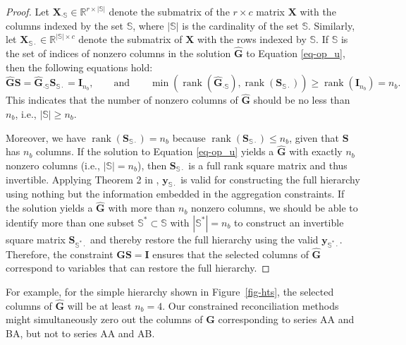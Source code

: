 \documentclass[
  11pt]{article}
\theoremstyle{plain}
\theoremstyle{remark}
\begin{document}
\begin{proof}
Let \(\bm{X}_{\cdot \mathbb{S}} \in \mathbb{R}^{r \times |\mathbb{S}|}\)
denote the submatrix of the \(r \times c\) matrix \(\bm{X}\) with the
columns indexed by the set \(\mathbb{S}\), where \(|\mathbb{S}|\) is the
cardinality of the set \(\mathbb{S}\). Similarly, let
\(\bm{X}_{\mathbb{S}\cdot} \in \mathbb{R}^{|\mathbb{S}| \times c}\)
denote the submatrix of \(\bm{X}\) with the rows indexed by
\(\mathbb{S}\). If \(\mathbb{S}\) is the set of indices of nonzero
columns in the solution \(\hat{\bm{G}}\) to Equation \eqref{eq-op_u},
then the following equations hold: \[
\hat{\bm{G}}\bm{S} = \hat{\bm{G}}_{\cdot \mathbb{S}}\bm{S}_{\mathbb{S}\cdot} = \bm{I}_{n_b},
\qquad\text{and}\qquad
\min \left(\operatorname{rank}(\hat{\bm{G}}_{\cdot \mathbb{S}}), \operatorname{rank}(\bm{S}_{\mathbb{S}\cdot})\right) \geq \operatorname{rank}(\bm{I}_{n_b})=n_b.
\] This indicates that the number of nonzero columns of \(\hat{\bm{G}}\)
should be no less than \(n_b\), i.e., \(|\mathbb{S}| \geq n_b\).

Moreover, we have
\(\operatorname{rank}(\bm{S}_{\mathbb{S}\cdot}) = n_b\) because
\(\operatorname{rank}(\bm{S}_{\mathbb{S}\cdot}) \leq n_b\), given that
\(\bm{S}\) has \(n_b\) columns. If the solution to Equation
\eqref{eq-op_u} yields a \(\hat{\bm{G}}\) with exactly \(n_b\) nonzero
columns (i.e., \(|\mathbb{S}|=n_b\)), then \(\bm{S}_{\mathbb{S}\cdot}\)
is a full rank square matrix and thus invertible. Applying Theorem 2 in
\citet{Zhang2023-op}, \(\bm{y}_{\mathbb{S}\cdot}\) is valid for
constructing the full hierarchy using nothing but the information
embedded in the aggregation constraints. If the solution yields a
\(\hat{\bm{G}}\) with more than \(n_b\) nonzero columns, we should be
able to identify more than one subset
\(\mathbb{S}^* \subset \mathbb{S}\) with \(|\mathbb{S}^*|=n_b\) to
construct an invertible square matrix \(\bm{S}_{\mathbb{S}^{*}\cdot}\)
and thereby restore the full hierarchy using the valid
\(\bm{y}_{\mathbb{S}^{*}\cdot}\). Therefore, the constraint
\(\bm{GS}=\bm{I}\) ensures that the selected columns of \(\hat{\bm{G}}\)
correspond to variables that can restore the full hierarchy.
\end{proof}

For example, for the simple hierarchy shown in Figure~\ref{fig-hts}, the
selected columns of \(\hat{\bm{G}}\) will be at least \(n_b=4\). Our
constrained reconciliation methods might simultaneously zero out the
columns of \(\bm{G}\) corresponding to series AA and BA, but not to
series AA and AB.
\end{document}
